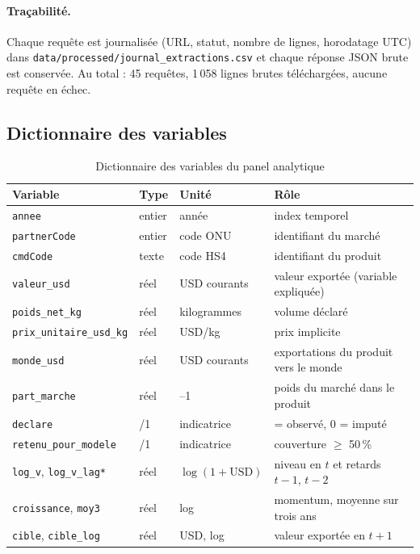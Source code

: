 \documentclass[11pt,a4paper]{article}
\begin{document}
\paragraph{Traçabilité.} Chaque requête est journalisée (URL, statut, nombre de
lignes, horodatage UTC) dans \texttt{data/processed/journal\_extractions.csv} et
chaque réponse JSON brute est conservée. Au total : 45 requêtes, 1\,058 lignes
brutes téléchargées, aucune requête en échec.

\subsection{Dictionnaire des variables}

\begin{table}[H]
\centering
\caption{Dictionnaire des variables du panel analytique}\label{tab:variables}
\small
\small
\begin{tabular}{>{\raggedright\arraybackslash}p{3.7cm}>{\raggedright\arraybackslash}p{1.4cm}>{\raggedright\arraybackslash}p{2.3cm}>{\raggedright\arraybackslash}p{5.5cm}}
\toprule
Variable & Type & Unité & Rôle \\
\midrule
\texttt{annee} & entier & année & index temporel \\
\texttt{partnerCode} & entier & code ONU & identifiant du marché \\
\texttt{cmdCode} & texte & code HS4 & identifiant du produit \\
\texttt{valeur\_usd} & réel & USD courants & valeur exportée (variable expliquée) \\
\texttt{poids\_net\_kg} & réel & kilogrammes & volume déclaré \\
\texttt{prix\_unitaire\_usd\_kg} & réel & USD/kg & prix implicite \\
\texttt{monde\_usd} & réel & USD courants & exportations du produit vers le monde \\
\texttt{part\_marche} & réel & 0--1 & poids du marché dans le produit \\
\texttt{declare} & 0/1 & indicatrice & 1 = observé, 0 = imputé \\
\texttt{retenu\_pour\_modele} & 0/1 & indicatrice & couverture $\geq$ 50\,\% \\
\texttt{log\_v}, \texttt{log\_v\_lag*} & réel & $\log(1+\text{USD})$ & niveau en $t$ et retards $t-1$, $t-2$ \\
\texttt{croissance}, \texttt{moy3} & réel & log & momentum, moyenne sur trois ans \\
\texttt{cible}, \texttt{cible\_log} & réel & USD, log & valeur exportée en $t+1$ \\
\bottomrule
\end{tabular}
\end{table}
\end{document}
